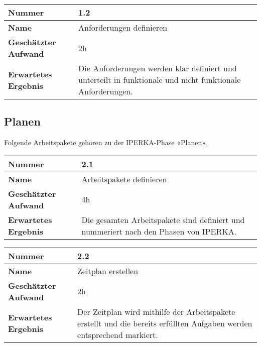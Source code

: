 \begin{longtable}{p{}|p{}}
	\hline
	\textbf{Nummer}                 & \textbf{1.2}            \\
	\hline
	\textbf{Name}   				& Anforderungen definieren                  \\
	\hline
	\textbf{Geschätzter Aufwand}    & 2h                                    \\
	\hline
	\textbf{Erwartetes Ergebnis}    & Die Anforderungen werden klar definiert und unterteilt in funktionale und nicht funktionale Anforderungen.                                    \\
	\hline
\end{longtable}\label{tab:informieren-1.2}

\subsection{Planen}
Folgende Arbeitspakete gehören zu der IPERKA-Phase «Planen».

\begin{longtable}{p{}|p{}}
	\hline
	\textbf{Nummer}                 & \textbf{2.1}            \\
	\hline
	\textbf{Name}   				& Arbeitspakete definieren                  \\
	\hline
	\textbf{Geschätzter Aufwand}    & 4h                                    \\
	\hline
	\textbf{Erwartetes Ergebnis}    & Die gesamten Arbeitspakete sind definiert und nummeriert nach den Phasen von IPERKA.                                    \\
	\hline
\end{longtable}\label{tab:planen-2.1}

\begin{longtable}{p{}|p{}}
	\hline
	\textbf{Nummer}                 & \textbf{2.2}            \\
	\hline
	\textbf{Name}   				& Zeitplan erstellen                  \\
	\hline
	\textbf{Geschätzter Aufwand}    & 2h                                    \\
	\hline
	\textbf{Erwartetes Ergebnis}    & Der Zeitplan wird mithilfe der Arbeitspakete erstellt und die bereits erfüllten Aufgaben werden entsprechend markiert.                                    \\
	\hline
\end{longtable}\label{tab:planen-2.2}

